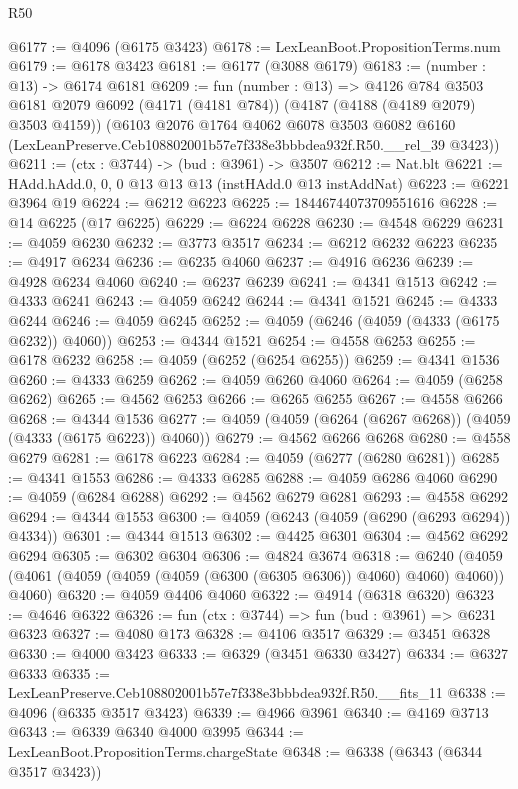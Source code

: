 \begin{lexlean}{R50}
\begin{coremodule}
@6177 := @4096 (@6175 @3423)
@6178 := LexLeanBoot.PropositionTerms.num
@6179 := @6178 @3423
@6181 := @6177 (@3088 @6179)
@6183 := (number : @13) -> @6174 @6181
@6209 := fun (number : @13) =>
  @4126
    @784
    @3503
    @6181
    @2079
    @6092
    (@4171 (@4181 @784))
    (@4187 (@4188 (@4189 @2079) @3503 @4159))
    (@6103
      @2076
      @1764
      @4062
      @6078
      @3503
      @6082
      @6160
      (LexLeanPreserve.Ceb108802001b57e7f338e3bbbdea932f.R50.__rel_39 @3423))
@6211 := (ctx : @3744) -> (bud : @3961) -> @3507
@6212 := Nat.blt
@6221 := HAdd.hAdd.{0, 0, 0} @13 @13 @13 (instHAdd.{0} @13 instAddNat)
@6223 := @6221 @3964 @19
@6224 := @6212 @6223
@6225 := 18446744073709551616
@6228 := @14 @6225 (@17 @6225)
@6229 := @6224 @6228
@6230 := @4548 @6229
@6231 := @4059 @6230
@6232 := @3773 @3517
@6234 := @6212 @6232 @6223
@6235 := @4917 @6234
@6236 := @6235 @4060
@6237 := @4916 @6236
@6239 := @4928 @6234 @4060
@6240 := @6237 @6239
@6241 := @4341 @1513
@6242 := @4333 @6241
@6243 := @4059 @6242
@6244 := @4341 @1521
@6245 := @4333 @6244
@6246 := @4059 @6245
@6252 := @4059 (@6246 (@4059 (@4333 (@6175 @6232)) @4060))
@6253 := @4344 @1521
@6254 := @4558 @6253
@6255 := @6178 @6232
@6258 := @4059 (@6252 (@6254 @6255))
@6259 := @4341 @1536
@6260 := @4333 @6259
@6262 := @4059 @6260 @4060
@6264 := @4059 (@6258 @6262)
@6265 := @4562 @6253
@6266 := @6265 @6255
@6267 := @4558 @6266
@6268 := @4344 @1536
@6277 := @4059 (@4059 (@6264 (@6267 @6268)) (@4059 (@4333 (@6175 @6223)) @4060))
@6279 := @4562 @6266 @6268
@6280 := @4558 @6279
@6281 := @6178 @6223
@6284 := @4059 (@6277 (@6280 @6281))
@6285 := @4341 @1553
@6286 := @4333 @6285
@6288 := @4059 @6286 @4060
@6290 := @4059 (@6284 @6288)
@6292 := @4562 @6279 @6281
@6293 := @4558 @6292
@6294 := @4344 @1553
@6300 := @4059 (@6243 (@4059 (@6290 (@6293 @6294)) @4334))
@6301 := @4344 @1513
@6302 := @4425 @6301
@6304 := @4562 @6292 @6294
@6305 := @6302 @6304
@6306 := @4824 @3674
@6318 := @6240 (@4059 (@4061 (@4059 (@4059 (@4059 (@6300 (@6305 @6306)) @4060) @4060) @4060)) @4060)
@6320 := @4059 @4406 @4060
@6322 := @4914 (@6318 @6320)
@6323 := @4646 @6322
@6326 := fun (ctx : @3744) => fun (bud : @3961) => @6231 @6323
@6327 := @4080 @173
@6328 := @4106 @3517
@6329 := @3451 @6328
@6330 := @4000 @3423
@6333 := @6329 (@3451 @6330 @3427)
@6334 := @6327 @6333
@6335 := LexLeanPreserve.Ceb108802001b57e7f338e3bbbdea932f.R50.__fits_11
@6338 := @4096 (@6335 @3517 @3423)
@6339 := @4966 @3961
@6340 := @4169 @3713
@6343 := @6339 @6340 @4000 @3995
@6344 := LexLeanBoot.PropositionTerms.chargeState
@6348 := @6338 (@6343 (@6344 @3517 @3423))

\end{coremodule}
\end{lexlean}
